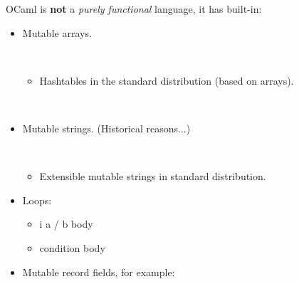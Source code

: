 \documentclass{beamer}
\newcommand{\tmem}[1]{{\em #1\/}}
\newcommand{\tmstrong}[1]{\textbf{#1}}
\begin{document}
OCaml is {\tmstrong{not}} a {\tmem{purely functional}} language, it has
built-in:
\begin{itemize}
  \item Mutable arrays.
  
  {}{}{\hlopt{= }}{}{}{}{}{}{\hlendline{}}\\
  {}{}{}{\hlopt{) <- }}{}{\hlopt{;
  }}{}{}{}{\hlopt{),
  }}{}{}{}{\hlopt{)}}{\hlendline{}}
  \begin{itemize}
    \item Hashtables in the standard distribution (based on arrays).
    
    {}{}{\hlopt{=
    }}{}{}{}{}{}{}\\
    {}{}{}{}{\hlstd{
    }}{}{\hlopt{; }}{}{}{}{}{\hlendline{}}
  \end{itemize}
  \item Mutable strings. (Historical reasons...)
  
  {}{}{\hlopt{=
  }}{}{}{}{}{}{}{\hlendline{}}\\
  {}{\hlopt{.[}}{}{\hlopt{] <- }}{}{\hlopt{;
  }}{}{\hlopt{.[}}{}{\hlopt{],
  }}{}{\hlopt{.[}}{}{\hlopt{]}}{\hlendline{}}
  \begin{itemize}
    \item Extensible mutable strings {}{}{} in
    standard distribution.
  \end{itemize}
  \item Loops:
  \begin{itemize}
    \item {} i {\hlopt{=}} a {}/{} b
    {} body {}
    
    \item {} condition {} body {}
  \end{itemize}
  \item Mutable record fields, for example:
  

\end{itemize}
\end{document}
